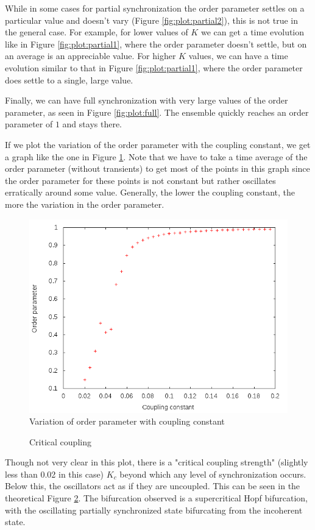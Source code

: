 \documentclass[12pt]{article}
\begin{document}
While in some cases for partial synchronization the order parameter settles on a particular value and doesn't vary (Figure \ref{fig:plot:partial2}), this is not true in the general case. For example, for lower values of $K$ we can get a time evolution like in Figure \ref{fig:plot:partial1}, where the order parameter doesn't settle, but on an average is an appreciable value. For higher $K$ values, we can have a time evolution similar to that in Figure \ref{fig:plot:partial1}, where the order parameter does settle to a single, large value.


Finally, we can have full synchronization with very large values of the order parameter, as seen in Figure \ref{fig:plot:full}. The ensemble quickly reaches an order parameter of $1$ and stays there.

If we plot the variation of the order parameter with the coupling constant, we get a graph like the one in Figure \ref{fig:plot:ovc}. Note that we have to take a time average of the order parameter (without transients) to get most of the points in this graph since the order parameter for these points is not constant but rather oscillates erratically around some value. Generally, the lower the coupling constant, the more the variation in the order parameter.

\begin{figure}
\centering
\includegraphics[scale=0.5]{data/ovcoupling}
\caption{Variation of order parameter with coupling constant}
\label{fig:plot:ovc}
\end{figure}
\begin{figure}
\centering


\caption{Critical coupling}\label{fig:crit}
\end{figure}
Though not very clear in this plot, there is a "critical coupling strength" (slightly less than 0.02 in this case) $K_c$ beyond which any level of synchronization occurs. Below this, the oscillators act as if they are uncoupled. This can be seen in the theoretical Figure \ref{fig:crit}. The bifurcation observed is a supercritical Hopf bifurcation\cite{niu2014bifurcation}, with the oscillating partially synchronized state bifurcating from the incoherent state.
\end{document}

